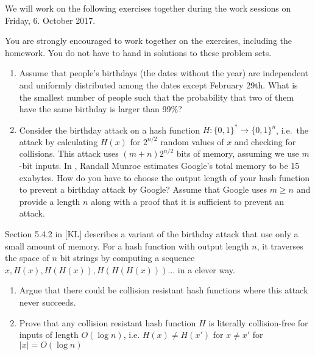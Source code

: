 \documentclass[a4paper,10pt,landscape,twocolumn]{scrartcl}
\newcommand\worksession{Friday, 6. October 2017}
\begin{document}
\problems

{\sffamily\noindent
We will work on the following exercises together during the work sessions on \worksession.

You are strongly encouraged to work together on the exercises, including the homework. You do not have to hand in solutions to these problem sets.}

\begin{exercise}
\begin{enumerate}
	\item Assume that people's birthdays (the dates without the year) are independent and uniformly distributed among the dates except February 29th. What is the smallest number of people such that the probability that two of them have the same birthday is larger than 99\%?
	\item Consider the birthday attack on a hash function $H: \{0,1\}^*\to\{0,1\}^n$, i.e.\ the attack by calculating $H(x)$ for $2^{n/2}$ random values of $x$ and checking for collisions. This attack uses $(m+n)2^{n/2}$ bits of memory, assuming we use $m$-bit inputs. In , Randall Munroe estimates Google's total memory to be 15 exabytes.  How do you have to choose the output length of your hash function to prevent a birthday attack by Google? Assume that Google uses $m\ge n$ and provide a length $n$ along with a proof that it is sufficient to prevent an attack.
\end{enumerate}
\end{exercise}

\begin{exercise}
Section 5.4.2 in [KL] describes a variant of the birthday attack that use only a small amount of memory. For a hash function with output length $n$, it traverses the space of $n$ bit strings by computing a sequence $x, H(x), H(H(x)), H(H(H(x)))...$ in a clever way.
\begin{enumerate}
	\item Argue that there could be collision resistant hash functions where this attack never succeeds.
	\item Prove that any collision resistant hash function $H$ is literally collision-free for inputs of length $O(\log n)$, i.e. $H(x)\neq H(x')$ for $x\neq x'$ for $|x|=O(\log n)$
\end{enumerate}
\end{exercise}
\end{document}
